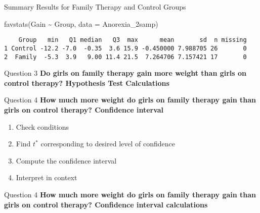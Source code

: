 \documentclass[
  ignorenonframetext,
  aspectratio=32,
]{beamer}
\newenvironment{Shaded}{\begin{snugshade}}{\end{snugshade}}
\newcommand{\AttributeTok}[1]{\textcolor[rgb]{0.40,0.45,0.13}{#1}}
\newcommand{\FunctionTok}[1]{\textcolor[rgb]{0.28,0.35,0.67}{#1}}
\newcommand{\NormalTok}[1]{\textcolor[rgb]{0.00,0.23,0.31}{#1}}
\newcommand{\SpecialCharTok}[1]{\textcolor[rgb]{0.37,0.37,0.37}{#1}}
\begin{document}
\begin{frame}[fragile]{Summary Results for Family Therapy and Control
Groups}
\protect\hypertarget{summary-results-for-family-therapy-and-control-groups}{}
\begin{Shaded}
\begin{Highlighting}[]
\FunctionTok{favstats}\NormalTok{(Gain }\SpecialCharTok{\textasciitilde{}}\NormalTok{ Group, }\AttributeTok{data =}\NormalTok{ Anorexia\_2samp)}
\end{Highlighting}
\end{Shaded}

\begin{verbatim}
    Group   min   Q1 median   Q3  max      mean       sd  n missing
1 Control -12.2 -7.0  -0.35  3.6 15.9 -0.450000 7.988705 26       0
2  Family  -5.3  3.9   9.00 11.4 21.5  7.264706 7.157421 17       0
\end{verbatim}
\end{frame}

\begin{frame}{Question 3}
\protect\hypertarget{question-3-1}{}
\textbf{Do girls on family therapy gain more weight than girls on
control therapy? Hypothesis Test Calculations}
\end{frame}

\begin{frame}{Question 4}
\protect\hypertarget{question-4}{}
\textbf{How much more weight do girls on family therapy gain than girls
on control therapy? Confidence interval}

\begin{enumerate}
\item
  Check conditions
\item
  Find \(t^*\) corresponding to desired level of confidence
\item
  Compute the confidence interval
\item
  Interpret in context
\end{enumerate}
\end{frame}

\begin{frame}
\begin{block}{Question 4}
\protect\hypertarget{question-4-1}{}
\textbf{How much more weight do girls on family therapy gain than girls
on control therapy? Confidence interval calculations}
\end{block}
\end{frame}
\end{document}
